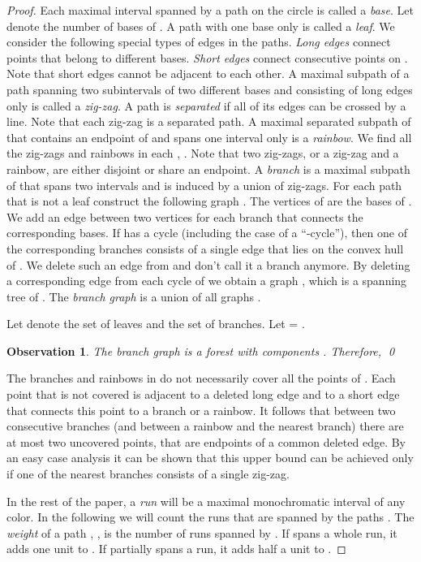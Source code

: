 \documentclass[12pt]{article}
\newtheorem{obs}[theorem]{Observation}
\begin{document}
\begin{proof}
Each maximal interval spanned by a path  on the circle is called a {\em base}. Let  denote the number of bases of . A path with one base only is called a {\em leaf}. We consider the following special types of edges in the paths. {\em Long edges\/} connect points that belong to different bases. {\em Short edges\/} connect consecutive points on . Note that short edges cannot be adjacent to each other. A maximal subpath of a path  spanning two subintervals of two different bases and consisting of long edges only is called a {\em zig-zag}. A path is {\em separated\/} if all of its edges can be crossed by a line. Note that each zig-zag is a separated path. A maximal separated subpath of  that contains an endpoint of  and spans one interval only is a {\em rainbow\/}. We find all the zig-zags and rainbows in each , . Note that two zig-zags, or a zig-zag and a rainbow, are either disjoint or share an endpoint.
A {\em branch\/} is a maximal subpath of  that spans two intervals and is induced by a union of zig-zags. 
For each path  that is not a leaf construct the following graph . The vertices of  are the bases of . We add an edge between two vertices for each branch that connects the corresponding bases.
If  has a cycle (including the case of a ``-cycle''), then one of the corresponding branches consists of a single edge that lies on the convex hull of . We delete such an edge from  and don't call it a branch anymore. By deleting a corresponding edge from each cycle of  we obtain a graph , which is a spanning tree of . The {\em branch graph}  is a union of all graphs .
 
Let  denote the set of leaves and  the set of branches. Let  =  .

\begin{obs}\label{o:branches}
The branch graph  is a forest with components . Therefore,  \qed
\end{obs}

The branches and rainbows in  do not necessarily cover all the points of . Each point that is not covered is adjacent to a deleted long edge and to a short edge that connects this point to a branch or a rainbow. It follows that between two consecutive branches (and between a rainbow and the nearest branch) there are at most two uncovered points, that are endpoints of a common deleted edge. By an easy case analysis it can be shown that this upper bound can be achieved only if one of the nearest branches consists of a single zig-zag.

In the rest of the paper, a {\em run\/} will be a maximal monochromatic interval of any color.
In the following we will count the runs that are spanned by the paths . The {\em weight\/} of a path , , is the number of runs spanned by . If  spans a whole run, it adds one unit to . If  partially spans a run, it adds half a unit to .


\end{proof}
\end{document}
